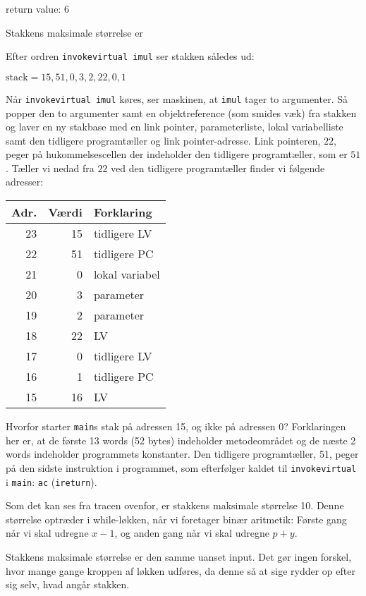 \documentclass[12pt,a4paper]{article}
\newcommand{\imul}{\texttt{imul}}
\begin{document}
return value: 6

Stakkens maksimale størrelse er 

Efter ordren \texttt{invokevirtual imul} ser stakken således ud:

$\text{stack} = 15, 51, 0, 3, 2, 22, 0, 1$

Når \texttt{invokevirtual imul} køres, ser maskinen, at \imul{} tager to
argumenter. Så popper den to argumenter samt en objektreference (som smides
væk) fra stakken og laver en ny stakbase med en link pointer, parameterliste,
lokal variabelliste samt den tidligere programtæller og link pointer-adresse.
Link pointeren, $22$, peger på hukommelsescellen der indeholder den tidligere
programtæller, som er $51$. Tæller vi nedad fra $22$ ved den tidligere
programtæller finder vi følgende adresser:

\begin{tabular}{|r|r|l|}
	\hline
	Adr. & Værdi & Forklaring \\
	\hline
	23 & 15 & tidligere LV \\
	22 & 51 & tidligere PC \\
	21 & 0 & lokal variabel \\
	20 & 3 & parameter \\
	19 & 2 & parameter \\
	18 & 22 & LV \\
	\hline
	17 & 0 & tidligere LV \\
	16 & 1 & tidligere PC \\
	15 & 16 & LV \\
	\hline
\end{tabular}

Hvorfor starter \texttt{main}s stak på adressen 15, og ikke på adressen 0?
Forklaringen her er, at de første 13 words (52 bytes) indeholder metodeområdet
og de næste 2 words indeholder programmets konstanter. Den tidligere
programtæller, 51, peger på den sidste instruktion i programmet, som
efterfølger kaldet til \texttt{invokevirtual} i \texttt{main}: \texttt{ac}
(\texttt{ireturn}).

Som det kan ses fra tracen ovenfor, er stakkens maksimale størrelse 10.  Denne
størrelse optræder i while-løkken, når vi foretager binær aritmetik: Første
gang når vi skal udregne $x-1$, og anden gang når vi skal udregne $p+y$.

Stakkens maksimale størrelse er den samme uanset input. Det gør ingen forskel,
hvor mange gange kroppen af løkken udføres, da denne så at sige rydder op efter
sig selv, hvad angår stakken.
\end{document}
